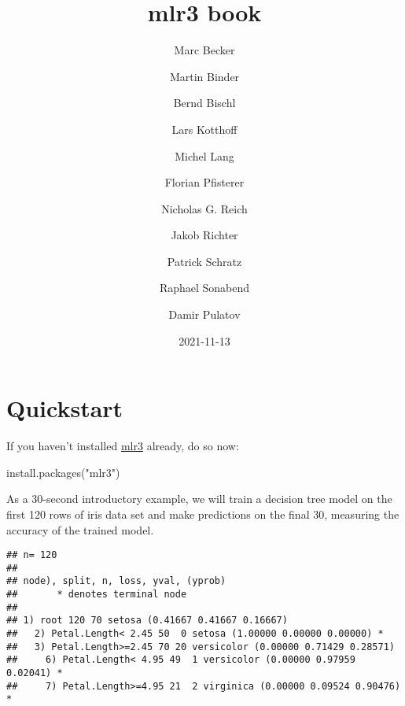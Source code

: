 \documentclass[
]{scrbook}
\title{mlr3 book}
\author{Marc Becker \and Martin Binder \and Bernd Bischl \and Lars Kotthoff \and Michel Lang \and Florian Pfisterer \and Nicholas G. Reich \and Jakob Richter \and Patrick Schratz \and Raphael Sonabend \and Damir Pulatov}
\date{2021-11-13}
\newenvironment{Shaded}{\begin{snugshade}}{\end{snugshade}}
\newcommand{\AttributeTok}[1]{\textcolor[rgb]{0.77,0.63,0.00}{#1}}
\newcommand{\CommentTok}[1]{\textcolor[rgb]{0.56,0.35,0.01}{\textit{#1}}}
\newcommand{\DecValTok}[1]{\textcolor[rgb]{0.00,0.00,0.81}{#1}}
\newcommand{\FunctionTok}[1]{\textcolor[rgb]{0.00,0.00,0.00}{#1}}
\newcommand{\NormalTok}[1]{#1}
\newcommand{\OtherTok}[1]{\textcolor[rgb]{0.56,0.35,0.01}{#1}}
\newcommand{\SpecialCharTok}[1]{\textcolor[rgb]{0.00,0.00,0.00}{#1}}
\newcommand{\StringTok}[1]{\textcolor[rgb]{0.31,0.60,0.02}{#1}}
\renewenvironment{Shaded} {\begin{snugshade}\small} {\end{snugshade}}
\begin{document}
\maketitle

{
\hypersetup{linkcolor=}
\setcounter{tocdepth}{1}
\tableofcontents
}
\hypertarget{quickstart}{%
\chapter*{Quickstart}\label{quickstart}}

If you haven't installed \href{https://mlr3.mlr-org.com}{mlr3} already, do so now:

\begin{Shaded}
\begin{Highlighting}[]
\FunctionTok{install.packages}\NormalTok{(}\StringTok{"mlr3"}\NormalTok{)}
\end{Highlighting}
\end{Shaded}

As a 30-second introductory example, we will train a decision tree model on the first 120 rows of iris data set and make predictions on the final 30, measuring the accuracy of the trained model.

\begin{Shaded}
\end{Shaded}

\begin{verbatim}
## n= 120 
## 
## node), split, n, loss, yval, (yprob)
##       * denotes terminal node
## 
## 1) root 120 70 setosa (0.41667 0.41667 0.16667)  
##   2) Petal.Length< 2.45 50  0 setosa (1.00000 0.00000 0.00000) *
##   3) Petal.Length>=2.45 70 20 versicolor (0.00000 0.71429 0.28571)  
##     6) Petal.Length< 4.95 49  1 versicolor (0.00000 0.97959 0.02041) *
##     7) Petal.Length>=4.95 21  2 virginica (0.00000 0.09524 0.90476) *
\end{verbatim}
\end{document}
